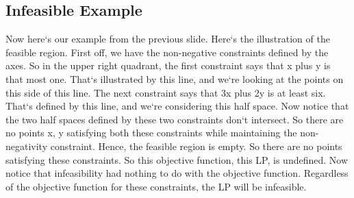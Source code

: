 \subsection{Infeasible Example}
Now here`s our example from the previous slide.
Here`s the illustration of the feasible region.
First off, we have the non-negative constraints defined by the axes.
So in the upper right quadrant, the first constraint says that x plus y is that most one.
That`s illustrated by this line, and we`re looking at the points on this side of this line.
The next constraint says that 3x plus 2y is at least six.
That`s defined by this line, and we`re considering this half space.
Now notice that the two half spaces defined by these two constraints don`t intersect.
So there are no points x, y satisfying both these constraints while maintaining the non-negativity constraint.
Hence, the feasible region is empty.
So there are no points satisfying these constraints.
So this objective function, this LP, is undefined.
Now notice that infeasibility had nothing to do with the objective function.
Regardless of the objective function for these constraints, the LP will be infeasible.

